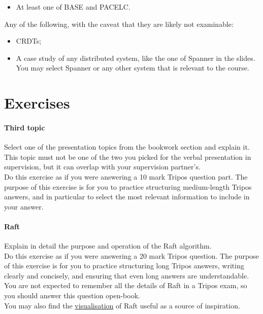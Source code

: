 \documentclass[12pt,a4paper,oneside,openright]{report}
\newcommand{\question}[2]{\paragraph{#1} #2}
\begin{document}
{\begin{description}
\begin{itemize}
    \item At least one of BASE and PACELC.
    \end{itemize}
  \item[Others] Any of the following, with the caveat that they are
    likely not examinable:
    \begin{itemize}
    \item CRDTs;
    \item A case study of any distributed system, like the one of
      Spanner in the slides. You may select Spanner or any other
      system that is relevant to the course.
    \end{itemize}
  \end{description}
}

\section{Exercises}

\question{Third topic}{Select one of the presentation topics from the
  bookwork section and explain it. This topic must not be one of the
  two you picked for the verbal presentation in supervision, but it
  can overlap with your supervision partner's.
  \\
  Do this exercise as if you were answering a 10 mark Tripos question
  part. The purpose of this exercise is for you to practice
  structuring medium-length Tripos answers, and in particular to
  select the most relevant information to include in your answer.  }

\question{Raft}{Explain in detail the purpose and operation of the
  Raft algorithm.
  \\
  Do this exercise as if you were answering a 20 mark Tripos
  question. The purpose of this exercise is for you to practice
  structuring long Tripos answers, writing clearly and concisely, and
  ensuring that even long answers are understandable.  You are not
  expected to remember all the details of Raft in a Tripos exam, so
  you should answer this question open-book.
  \\
  You may also find the
  \href{http://thesecretlivesofdata.com/raft/}{visualisation} of Raft
  useful as a source of inspiration.  }


\end{document}
